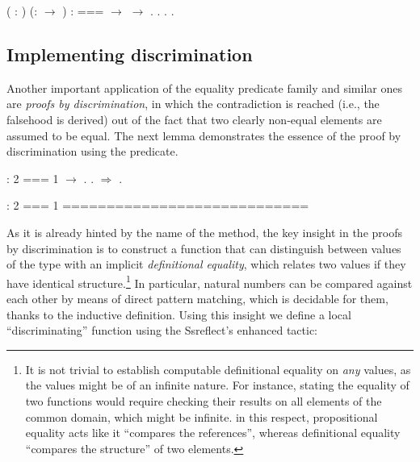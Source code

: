 \begin{coqdoccode}
\coqdocemptyline
\coqdocnoindent
{}   ( : ) (:  \ensuremath{\rightarrow} ) :  ===  \ensuremath{\rightarrow}   \ensuremath{\rightarrow}  .\coqdoceol
\coqdocnoindent
{}.  . .\coqdoceol
\coqdocemptyline
\end{coqdoccode}


\subsection{Implementing discrimination}


\label{sec:discr}


Another important application of the equality predicate family and
similar ones  are \textit{proofs by discrimination},
in which the contradiction is reached (i.e., the falsehood is derived)
out of the fact that two clearly non-equal elements are assumed to be
equal. The next lemma demonstrates the essence of the proof by
discrimination using the  predicate.


\begin{coqdoccode}
\coqdocemptyline
\coqdocnoindent
{}  : 2 === 1 \ensuremath{\rightarrow} .\coqdoceol
\coqdocnoindent
{}.\coqdoceol
\coqdocnoindent
{}\ensuremath{\Rightarrow} .\coqdoceol
\coqdocemptyline
\end{coqdoccode}


\coqdoceol
\coqdocemptyline
\coqdocindent{1.00em}
 : 2 === 1\coqdoceol
\coqdocindent{1.00em}
============================\coqdoceol
\coqdocindent{1.50em}

\coqdocemptyline


As it is already hinted by the name of the method, the key insight in
the proofs by discrimination is to construct a function that can
distinguish between values of the type with an implicit \textit{definitional
equality}, which relates two values if
they have identical structure.\footnote{It is not trivial to
establish computable definitional equality on \emph{any} values, as
the values might be of an infinite nature. For instance, stating the
equality of two functions would require checking their results on all
elements of the common domain, which might be infinite. in this
respect, propositional equality acts like it ``compares the
references'', whereas definitional equality ``compares the structure''
of two elements.} In particular, natural numbers can be compared
against each other by means of direct pattern matching, which is
decidable for them, thanks to the inductive definition. Using this
insight we define a local ``discriminating'' function  using the
Ssreflect's enhanced   tactic:


